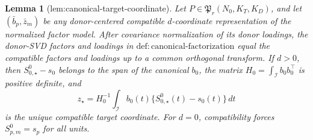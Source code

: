 \documentclass{article}
\newtheorem{lemma}{Lemma}
\begin{document}
\begin{lemma}[lem:canonical-target-coordinate]\label{lem:canonical-target-coordinate}
Let \(P\in\mathfrak P_r(N_0,K_T,K_D)\), and let \((\bar b_p,\bar z_m)\) be any donor-centered compatible \(d\)-coordinate representation of the normalized factor model. After covariance normalization of its donor loadings, the donor-SVD factors and loadings in \(\mathrm{def:canonical\mbox{-}factorization}\) equal the compatible factors and loadings up to a common orthogonal transform. If \(d>0\), then \(S^0_{0,\star}-s_0\) belongs to the span of the canonical \(b_0\), the matrix \(H_0=\int_{\mathcal I}b_0b_0^\top\) is positive definite, and
\[
 z_\star=H_0^{-1}\int_{\mathcal I}b_0(t)
 \{S^0_{0,\star}(t)-s_0(t)\}\,dt
\]
is the unique compatible target coordinate. For \(d=0\), compatibility forces \(S^0_{p,m}=s_p\) for all units.
\end{lemma}
\end{document}
